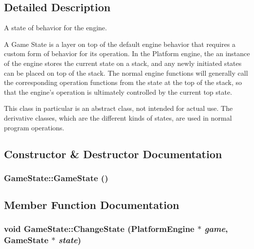 \subsection{Detailed Description}
A state of behavior for the engine. 

A Game State is a layer on top of the default engine behavior that requires a custom form of behavior for its operation. In the Platform engine, the an instance of the engine stores the current state on a stack, and any newly initiated states can be placed on top of the stack. The normal engine functions will generally call the corresponding operation functions from the state at the top of the stack, so that the engine's operation is ultimately controlled by the current top state.

This class in particular is an abstract class, not intended for actual use. The derivative classes, which are the different kinds of states, are used in normal program operations. 

\subsection{Constructor \& Destructor Documentation}
\hypertarget{class_game_state_4fa0a2bf50315c4a35a3890a0adcee5c}{
\subsubsection[{GameState}]{\setlength{\rightskip}{0pt plus 5cm}GameState::GameState ()}}
\label{class_game_state_4fa0a2bf50315c4a35a3890a0adcee5c}




\subsection{Member Function Documentation}
\hypertarget{class_game_state_f786aeb704a22a135dc289bb89fcc452}{
\subsubsection[{ChangeState}]{\setlength{\rightskip}{0pt plus 5cm}void GameState::ChangeState ({\bf PlatformEngine} $\ast$ {\em game}, \/  {\bf GameState} $\ast$ {\em state})}}
\label{class_game_state_f786aeb704a22a135dc289bb89fcc452}


